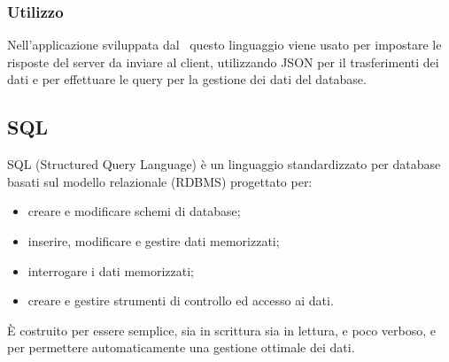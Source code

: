 	\subsubsection{Utilizzo}
	Nell'applicazione sviluppata dal \ questo linguaggio viene usato per impostare le risposte del server da inviare al client, utilizzando JSON per il trasferimenti dei dati e per effettuare le query per la gestione dei dati del database.

\subsection{SQL}
	SQL (Structured Query Language) è un linguaggio standardizzato per database basati sul modello relazionale (RDBMS) progettato per:
	\begin{itemize}
		\item 	creare e modificare schemi di database;
		\item 	inserire, modificare e gestire dati memorizzati;
		\item 	interrogare i dati memorizzati;
		\item 	creare e gestire strumenti di controllo ed accesso ai dati.
	\end{itemize}
	È costruito per essere semplice, sia in scrittura sia in lettura, e poco verboso, e per permettere automaticamente una gestione ottimale dei dati. \\
	
